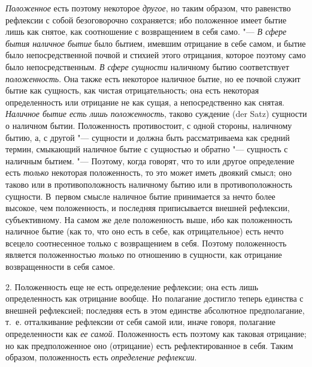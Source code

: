 {\em Положенное} есть поэтому некоторое
{\em другое}, но таким образом, что равенство рефлексии
с собой безоговорочно сохраняется; ибо положенное имеет бытие лишь как
снятое, как соотношение с возвращением в себя само. "---
{\em В сфере бытия наличное бытие }было бытием, имевшим
отрицание в себе самом, и бытие было непосредственной почвой и стихией
этого отрицания, которое поэтому само было непосредственным.
{\em В сфере сущности} наличному бытию соответствует
{\em положенность}. Она также есть некоторое наличное
бытие, но ее почвой служит бытие как сущность, как чистая отрицательность;
она есть некоторая определенность или отрицание не как сущая, а
непосредственно как снятая. {\em Наличное бытие есть
лишь положенность}, таково суждение (der Satz) сущности о наличном бытии.
Положенность противостоит, с одной стороны, наличному бытию, а, с другой
"--- сущности и должна быть рассматриваема как средний термин, смыкающий
наличное бытие с сущностью и обратно "--- сущность с наличным бытием. "---
Поэтому, когда говорят, что то или другое определение есть
{\em только} некоторая положенность, то это может иметь
двоякий смысл; оно таково или в противоположность наличному бытию или в
противоположность сущности. В~первом смысле наличное бытие принимается за
нечто более высокое, чем положенность, и последняя приписывается внешней
рефлексии, субъективному. На самом же деле положенность выше, ибо как
положенность наличное бытие (как то, что оно есть в себе, как
отрицательное) есть нечто всецело соотнесенное только с возвращением в
себя. Поэтому положенность является положенностью
{\em только} по отношению в сущности, как отрицание
возвращенности в себя самое.

2. Положенность еще не есть определение рефлексии; она есть лишь
определенность как отрицание вообще. Но полагание достигло теперь единства
с внешней рефлексией; последняя есть в этом единстве абсолютное
предполагание, т.~е. отталкивание рефлексии от себя самой или, иначе
говоря, полагание определенности как {\em ее самой}.
Положенность есть поэтому как таковая отрицание; но как предположенное оно
(отрицание) есть рефлектированное в себя. Таким образом, положенность есть
{\em определение рефлексии}.

